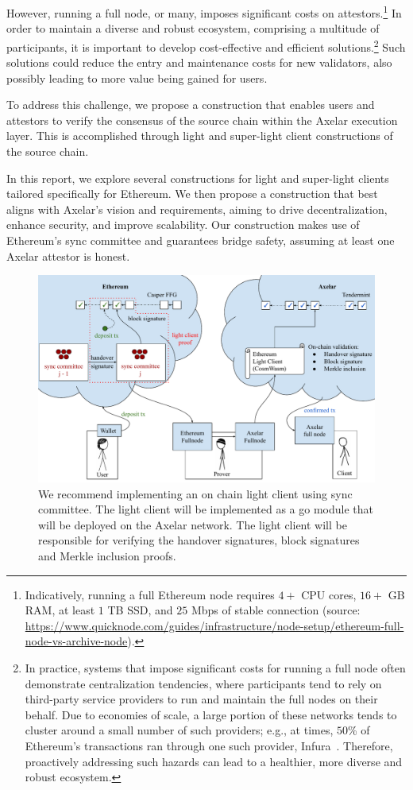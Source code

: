 However, running a full node, or many, imposes significant costs on
attestors.\footnote{Indicatively, running a full Ethereum node requires $4+$
CPU cores, $16+$ GB RAM, at least $1$ TB SSD, and $25$ Mbps of stable
connection (source:
\url{https://www.quicknode.com/guides/infrastructure/node-setup/ethereum-full-node-vs-archive-node}).}
In order to maintain a diverse and robust ecosystem, comprising a multitude of
participants, it is important to develop cost-effective and efficient
solutions.\footnote{In practice, systems that impose significant costs for running a full node often demonstrate centralization tendencies, where participants tend to rely on
third-party service providers to run and maintain the full nodes on their behalf. Due to economies of scale, a large portion of these networks tends to cluster around a small number of such providers; e.g., at times, $50$\% of Ethereum's transactions ran through one such provider, Infura~\cite{infura}. Therefore, proactively addressing such hazards can lead to a healthier, more diverse and robust ecosystem.}
Such solutions could reduce the entry and maintenance costs for new validators,
also possibly leading to more value being gained for users.

To address this challenge, we propose a construction that enables users and attestors to verify the consensus of the source chain within the Axelar execution layer. This is accomplished through light and super-light client constructions of the source chain.

In this report, we explore several constructions for light and super-light clients tailored specifically for Ethereum. We then propose a construction that best aligns with Axelar's vision and requirements, aiming to drive decentralization, enhance security, and improve scalability. Our construction makes use of Ethereum's sync committee and guarantees bridge safety, assuming at least one Axelar attestor is honest.

\begin{figure}
    \includegraphics[scale=0.55]{figures/axelar_light_client_architecture.pdf}
    \caption{We recommend implementing an on chain light client using sync committee. The light client will be implemented as a go module that will be deployed on the Axelar network. The light client will be responsible for verifying the handover signatures, block signatures and Merkle inclusion proofs.}
    \label{fig.axelar_light_client_architecture}
\end{figure}


